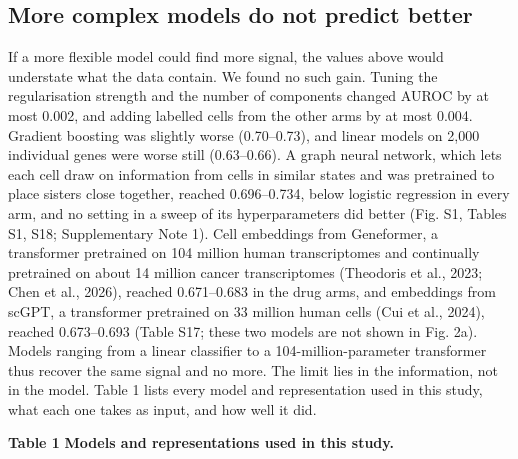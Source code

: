 \documentclass[11pt,a4paper]{article}
\begin{document}
\subsection*{More complex models do not predict better}

If a more flexible model could find more signal, the values above would understate what the data contain. We found no such gain. Tuning the regularisation strength and the number of components changed AUROC by at most 0.002, and adding labelled cells from the other arms by at most 0.004. Gradient boosting was slightly worse (0.70--0.73), and linear models on 2,000 individual genes were worse still (0.63--0.66). A graph neural network, which lets each cell draw on information from cells in similar states and was pretrained to place sisters close together, reached 0.696--0.734, below logistic regression in every arm, and no setting in a sweep of its hyperparameters did better (Fig. S1, Tables S1, S18; Supplementary Note 1). Cell embeddings from Geneformer, a transformer pretrained on 104 million human transcriptomes and continually pretrained on about 14 million cancer transcriptomes (Theodoris et al., 2023; Chen et al., 2026), reached 0.671--0.683 in the drug arms, and embeddings from scGPT, a transformer pretrained on 33 million human cells (Cui et al., 2024), reached 0.673--0.693 (Table S17; these two models are not shown in Fig. 2a). Models ranging from a linear classifier to a 104-million-parameter transformer thus recover the same signal and no more. The limit lies in the information, not in the model. Table 1 lists every model and representation used in this study, what each one takes as input, and how well it did.

\textbf{Table 1} \textbf{Models and representations used in this study.}
\end{document}
